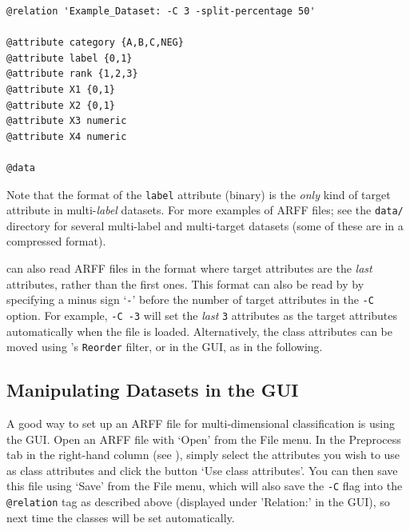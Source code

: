 \documentclass[11pt]{article}
\newcommand{\MEKA}{Meka}
\newcommand{\WEKA}{Weka}
\newcommand{\MULAN}{Mulan}
\begin{document}
{\small
\begin{verbatim}
@relation 'Example_Dataset: -C 3 -split-percentage 50'

@attribute category {A,B,C,NEG}
@attribute label {0,1}
@attribute rank {1,2,3}
@attribute X1 {0,1}
@attribute X2 {0,1}
@attribute X3 numeric
@attribute X4 numeric

@data
\end{verbatim}
}

Note that the format of the \texttt{label} attribute (binary) is the \emph{only} kind of target attribute in multi-\emph{label} datasets. For more examples of \framework{\MEKA} ARFF files; see the \texttt{data/} directory for several multi-label and multi-target datasets (some of these are in a compressed format).

\framework{\MEKA} can also read ARFF files in the \framework{\MULAN} format where target attributes are the \emph{last} attributes, rather than the first ones. This format can also be read by \framework{\MEKA} by specifying a minus sign `\texttt{-}' before the number of target attributes in the \texttt{-C} option. For example, \texttt{-C -3} will set the \emph{last} \texttt{3} attributes as the target attributes automatically when the file is loaded. Alternatively, the class attributes can be moved using \framework{\WEKA}'s \texttt{Reorder} filter, or in the GUI, as in the following. %


\subsection{Manipulating Datasets in the GUI}
\label{sec:data.gui}

A good way to set up an ARFF file for multi-dimensional classification is using the GUI. Open an ARFF file with `\textsf{Open}' from the \textsf{File} menu. In the \textsf{Preprocess} tab in the right-hand column (see ), simply select the attributes you wish to use as class attributes and click the button `\textsf{Use class attributes}'. You can then save this file using `\textsf{Save}' from the \textsf{File} menu, which will also save the \texttt{-C} flag into the \texttt{@relation} tag as described above (displayed under '\textsf{Relation:}' in the GUI), so next time the classes will be set automatically.
\end{document}
